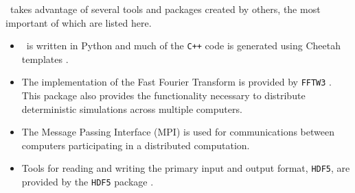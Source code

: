 \xpdeint\ takes advantage of several tools and packages created by others, the most important of which are listed here.
\begin{itemize}
    \item \xpdeint\ is written in Python \citep{Python} and much of the \texttt{C++} code is generated using Cheetah templates \citep{CheetahTemplates}.
    \item The implementation of the Fast Fourier Transform is provided by \texttt{FFTW3} \citep{Frigo:2005}.  This package also provides the functionality necessary to distribute deterministic simulations across multiple computers.
    \item The Message Passing Interface (MPI) \citep{MPI} is used for communications between computers participating in a distributed computation.
    \item Tools for reading and writing the primary input and output format, \texttt{HDF5}, are provided by the \texttt{HDF5} package \citep{HDF5}.
\end{itemize}




